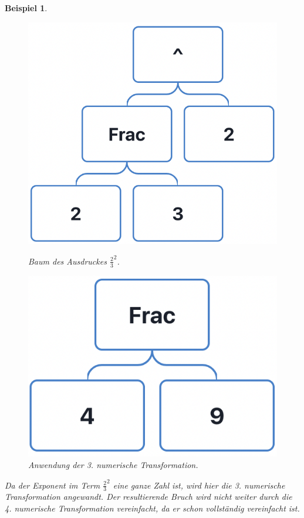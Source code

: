 \documentclass[11pt]{article}
\newtheorem{example}{Beispiel}
\begin{document}
\begin{example} \normalfont
  \begin{figure}[h]
    \begin{minipage}{.5\textwidth}
      \centering
      \includegraphics[scale=0.4]{trees/power/beispiel_1_1.png}
      \caption{Baum des Ausdruckes $\frac{2}{3}^2$.}
    \end{minipage}
    \begin{minipage}{.5\textwidth}
      \centering
      \includegraphics[scale=0.4]{trees/power/beispiel_1_2.png}
      \caption{Anwendung der 3. numerische Transformation.}
    \end{minipage}
  \end{figure}
  Da der Exponent im Term $\frac{2}{3}^2$ eine ganze Zahl ist, wird hier die 3. numerische Transformation angewandt. 
  Der resultierende Bruch wird nicht weiter durch die 4. numerische Transformation vereinfacht,
  da er schon vollständig vereinfacht ist.
\end{example}
\end{document}
